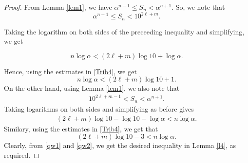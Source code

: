 \documentclass[10pt,a4paper]{amsart}
\begin{document}
\begin{proof}
\noindent From Lemma  \ref{lem1}, we have $\alpha^{n-1} \le  S_n <  \alpha^{n+1}$. So, we note that 
\begin{equation*}
\alpha^{n-1} \le  S_n < 10^{2\ell + m}.
\end{equation*}

\noindent Taking the logarithm on both sides of the preceeding inequality and simplifying,  we get 

\begin{equation*}
n \log \alpha < (2\ell + m) \log 10 + \log \alpha.
\end{equation*}

\noindent Hence, using the estimates in \eqref{Trib4}, we get
\begin{equation}\label{qw1}
n \log \alpha < (2\ell + m) \log 10 + 1. 
\end{equation}
\noindent
On the other hand, using Lemma \ref{lem1},  we also note that 
\begin{align*}
10^{2\ell + m -1} < S_n <  \alpha^{n+1}.
\end{align*}
Taking logarithms on both sides and simplifying as before gives
\begin{align*}
(2\ell +m)\log 10-\log 10 - \log \alpha < n\log \alpha.
\end{align*}
Similary, using the estimates in \eqref{Trib4}, we get that
\begin{equation}\label{qw2}
(2\ell +m)\log 10-3 < n\log \alpha.
\end{equation}
Clearly, from \eqref{qw1} and \eqref{qw2}, we get the desired inequality in Lemma \ref{l4}, as required.
\end{proof}
\end{document}
